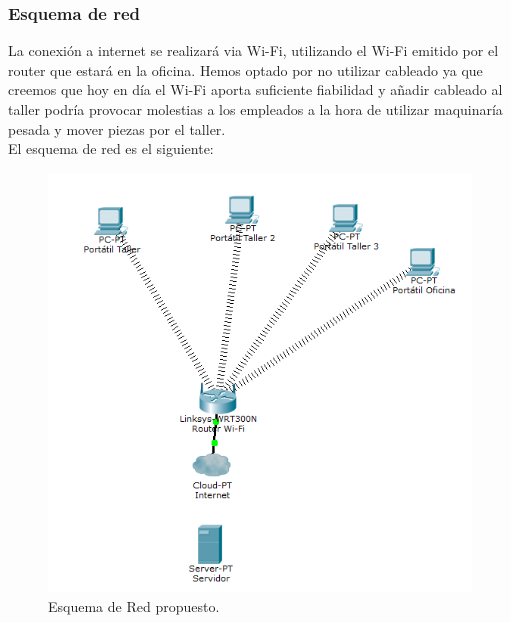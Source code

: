 \documentclass{article}
\begin{document}
\subsubsection{Esquema de red}
La conexión a internet se realizará via Wi-Fi, utilizando el Wi-Fi emitido por el router que estará en la oficina. Hemos optado 
por no utilizar cableado ya que creemos que hoy en día el Wi-Fi aporta suficiente fiabilidad y añadir cableado al taller podría provocar molestias a los empleados a la hora de utilizar 
maquinaría pesada y mover piezas por el taller.\\ 
El esquema de red es el siguiente: 
\begin{figure}[H]
  \centering
  \includegraphics[width=1.0\textwidth]{CapturasSistemas/EsquemaRed.png}
  \caption{Esquema de Red propuesto.}
\end{figure}
\end{document}
